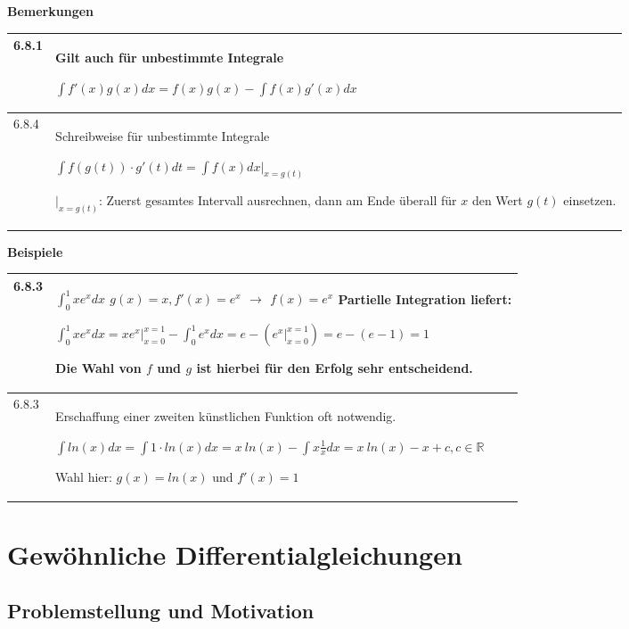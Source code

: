     \noindent
    \textbf{Bemerkungen}
    \begin{table}[H]
    \begin{tabularx}{\textwidth}{X m{16cm}}
        \toprule

        6.8.1 & Gilt auch für unbestimmte Integrale \hfill \break
                \centerline{$ \int f'(x)g(x)dx = f(x) g(x) - \int f(x)g'(x) dx$} \\
        \midrule
        6.8.4 & Schreibweise für unbestimmte Integrale \hfill \break
                \centerline{$ \int f(g(t)) \cdot g'(t) dt = \int f(x) dx \vert_{x=g(t)}$}
                $\vert_{x=g(t)}$: Zuerst gesamtes Intervall ausrechnen, dann am Ende überall für $x$ den Wert $g(t)$ einsetzen. \\   

        \bottomrule
    \end{tabularx}
    \end{table}

    \noindent
    \textbf{Beispiele}
    \begin{table}[H]
    \begin{tabularx}{\textwidth}{X m{16cm}}
        \toprule

        6.8.3 & $\int_0^1 x e^x dx$ \hfill \break
                $g(x) = x, f'(x) = e^x$ $\rightarrow$ $f(x) = e^x$ \hfill \break
                Partielle Integration liefert: \hfill \break
                \centerline{$ \int_0^1 x e^x dx = xe^x \vert_{x=0}^{x=1} - \int_0^1 e^x dx = e- (e^x \vert_{x=0}^{x=1}) =
                e- (e-1) = 1 $} \hfill \break
                Die Wahl von $f$ und $g$ ist hierbei für den Erfolg sehr entscheidend. \\
        \midrule
        6.8.3 & Erschaffung einer zweiten künstlichen Funktion oft notwendig. \hfill \break
                \centerline{$\int ln(x) dx = \int 1 \cdot ln(x) dx= x~ln(x) - \int x\frac{1}{x}dx = x~ln(x) - x + c, c \in \mathbb{R}$}
                Wahl hier: $g(x) = ln(x)$ und $f'(x) = 1$ \\

        \bottomrule
    \end{tabularx}
    \end{table}

\section{Gewöhnliche Differentialgleichungen}
\subsection{Problemstellung und Motivation}

